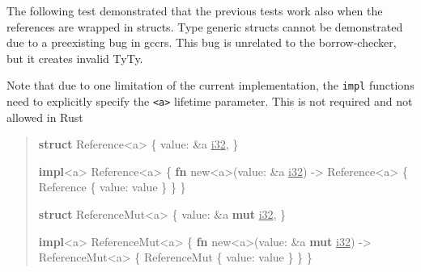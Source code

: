 \documentclass[
  11pt,
  twoside]{report}
\newenvironment{Shaded}{}{}
\newcommand{\DataTypeTok}[1]{\underline{#1}}
\newcommand{\KeywordTok}[1]{\textbf{#1}}
\newcommand{\NormalTok}[1]{#1}
\newcommand{\OperatorTok}[1]{#1}
\newcommand{\OtherTok}[1]{#1}
\begin{document}
The following test demonstrated that the previous tests work also when
the references are wrapped in structs. Type generic structs cannot be
demonstrated due to a preexisting bug in gccrs. This bug is unrelated to
the borrow-checker, but it creates invalid TyTy.

Note that due to one limitation of the current implementation, the
\texttt{impl} functions need to explicitly specify the
\texttt{\textless{}\textquotesingle{}a\textgreater{}} lifetime
parameter. This is not required and not allowed in Rust

\begin{quote}
\begin{Shaded}
\begin{Highlighting}[]
\KeywordTok{struct}\NormalTok{ Reference}\OperatorTok{\textless{}}\OtherTok{\textquotesingle{}a}\OperatorTok{\textgreater{}} \OperatorTok{\{}
\NormalTok{    value}\OperatorTok{:} \OperatorTok{\&}\OtherTok{\textquotesingle{}a} \DataTypeTok{i32}\OperatorTok{,}
\OperatorTok{\}}

\KeywordTok{impl}\OperatorTok{\textless{}}\OtherTok{\textquotesingle{}a}\OperatorTok{\textgreater{}}\NormalTok{ Reference}\OperatorTok{\textless{}}\OtherTok{\textquotesingle{}a}\OperatorTok{\textgreater{}} \OperatorTok{\{}
    \KeywordTok{fn}\NormalTok{ new}\OperatorTok{\textless{}}\OtherTok{\textquotesingle{}a}\OperatorTok{\textgreater{}}\NormalTok{(value}\OperatorTok{:} \OperatorTok{\&}\OtherTok{\textquotesingle{}a} \DataTypeTok{i32}\NormalTok{) }\OperatorTok{{-}\textgreater{}}\NormalTok{ Reference}\OperatorTok{\textless{}}\OtherTok{\textquotesingle{}a}\OperatorTok{\textgreater{}} \OperatorTok{\{}
\NormalTok{        Reference }\OperatorTok{\{}\NormalTok{ value}\OperatorTok{:}\NormalTok{ value }\OperatorTok{\}}
    \OperatorTok{\}}
\OperatorTok{\}}

\KeywordTok{struct}\NormalTok{ ReferenceMut}\OperatorTok{\textless{}}\OtherTok{\textquotesingle{}a}\OperatorTok{\textgreater{}} \OperatorTok{\{}
\NormalTok{    value}\OperatorTok{:} \OperatorTok{\&}\OtherTok{\textquotesingle{}a} \KeywordTok{mut} \DataTypeTok{i32}\OperatorTok{,}
\OperatorTok{\}}

\KeywordTok{impl}\OperatorTok{\textless{}}\OtherTok{\textquotesingle{}a}\OperatorTok{\textgreater{}}\NormalTok{ ReferenceMut}\OperatorTok{\textless{}}\OtherTok{\textquotesingle{}a}\OperatorTok{\textgreater{}} \OperatorTok{\{}
    \KeywordTok{fn}\NormalTok{ new}\OperatorTok{\textless{}}\OtherTok{\textquotesingle{}a}\OperatorTok{\textgreater{}}\NormalTok{(value}\OperatorTok{:} \OperatorTok{\&}\OtherTok{\textquotesingle{}a} \KeywordTok{mut} \DataTypeTok{i32}\NormalTok{) }\OperatorTok{{-}\textgreater{}}\NormalTok{ ReferenceMut}\OperatorTok{\textless{}}\OtherTok{\textquotesingle{}a}\OperatorTok{\textgreater{}} \OperatorTok{\{}
\NormalTok{        ReferenceMut }\OperatorTok{\{}\NormalTok{ value}\OperatorTok{:}\NormalTok{ value }\OperatorTok{\}}
    \OperatorTok{\}}
\OperatorTok{\}}
\end{Highlighting}
\end{Shaded}
\end{quote}
\end{document}

